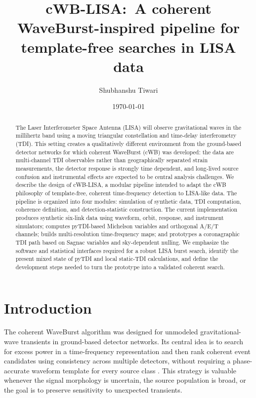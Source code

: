 \documentclass[%
 reprint,
 amsmath,amssymb,
 aps,
 prd,
]{revtex4-2}
\begin{document}

\title{cWB-LISA:\ A coherent WaveBurst-inspired pipeline for template-free searches in LISA data}

\author{Shubhanshu Tiwari}

\date{\today}

\begin{abstract}
The Laser Interferometer Space Antenna (LISA) will observe gravitational waves in the millihertz band using a moving triangular constellation and time-delay interferometry (TDI).  This setting creates a qualitatively different environment from the ground-based detector networks for which coherent WaveBurst (cWB) was developed: the data are multi-channel TDI observables rather than geographically separated strain measurements, the detector response is strongly time dependent, and long-lived source confusion and instrumental effects are expected to be central analysis challenges.  We describe the design of cWB-LISA, a modular pipeline intended to adapt the cWB philosophy of template-free, coherent time-frequency detection to LISA-like data.  The pipeline is organized into four modules: simulation of synthetic data, TDI computation, coherence definition, and detection-statistic construction.  The current implementation produces synthetic six-link data using waveform, orbit, response, and instrument simulators; computes pyTDI-based Michelson variables and orthogonal A/E/T channels; builds multi-resolution time-frequency maps; and prototypes a coronagraphic TDI path based on Sagnac variables and sky-dependent nulling.  We emphasize the software and statistical interfaces required for a robust LISA burst search, identify the present mixed state of pyTDI and local static-TDI calculations, and define the development steps needed to turn the prototype into a validated coherent search.
\end{abstract}

\maketitle

\section{Introduction}
\label{sec:introduction}

The coherent WaveBurst algorithm was designed for unmodeled gravitational-wave transients in ground-based detector networks.  Its central idea is to search for excess power in a time-frequency representation and then rank coherent event candidates using consistency across multiple detectors, without requiring a phase-accurate waveform template for every source class \cite{Drago2021cWB}.  This strategy is valuable whenever the signal morphology is uncertain, the source population is broad, or the goal is to preserve sensitivity to unexpected transients.
\end{document}
